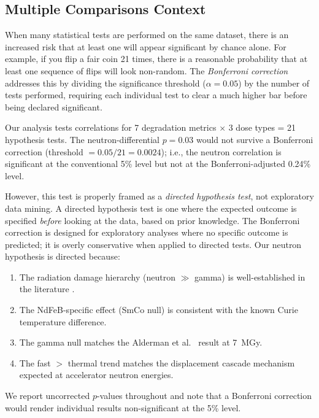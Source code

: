 \documentclass[11pt,letterpaper]{article}
\begin{document}
\subsection{Multiple Comparisons Context}
\label{sec:multiple_comparisons}

When many statistical tests are performed on the same dataset, there is an
increased risk that at least one will appear significant by chance alone. For
example, if you flip a fair coin 21 times, there is a reasonable probability
that at least one sequence of flips will look non-random. The \emph{Bonferroni
correction} addresses this by dividing the significance threshold ($\alpha =
0.05$) by the number of tests performed, requiring each individual test to
clear a much higher bar before being declared significant.

Our analysis tests correlations for 7 degradation metrics $\times$ 3 dose
types = 21 hypothesis tests. The neutron-differential $p = 0.03$ would
not survive a Bonferroni correction (threshold $= 0.05/21 = 0.0024$);
i.e., the neutron correlation is significant at the conventional 5\% level
but not at the Bonferroni-adjusted 0.24\% level.

However, this test is properly framed as a \textit{directed hypothesis test},
not exploratory data mining. A directed hypothesis test is one where the
expected outcome is specified \emph{before} looking at the data, based on
prior knowledge. The Bonferroni correction is designed for exploratory
analyses where no specific outcome is predicted; it is overly conservative
when applied to directed tests. Our neutron hypothesis is directed because:
\begin{enumerate}
    \item The radiation damage hierarchy (neutron $\gg$ gamma) is
    well-established in the literature \cite{Samin2018,Simos2018,Bizen2016,Alderman,Miyahara}.
    \item The NdFeB-specific effect (SmCo null) is consistent with the known
    Curie temperature difference.
    \item The gamma null matches the Alderman et al.~\cite{Alderman} result at \SI{7}{MGy}.
    \item The fast $>$ thermal trend matches the displacement cascade mechanism
    expected at accelerator neutron energies.
\end{enumerate}

We report uncorrected $p$-values throughout and note that a Bonferroni
correction would render individual results non-significant at the 5\% level.
\end{document}

